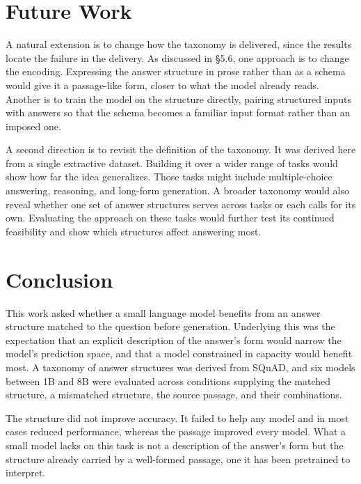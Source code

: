 \documentclass{article}
\begin{document}
\section{Future Work}

A natural extension is to change how the taxonomy is delivered, since the results locate the failure in the delivery. As discussed in \S5.6, one approach is to change the encoding. Expressing the answer structure in prose rather than as a schema would give it a passage-like form, closer to what the model already reads. Another is to train the model on the structure directly, pairing structured inputs with answers so that the schema becomes a familiar input format rather than an imposed one.

A second direction is to revisit the definition of the taxonomy. It was derived here from a single extractive dataset. Building it over a wider range of tasks would show how far the idea generalizes. Those tasks might include multiple-choice answering, reasoning, and long-form generation. A broader taxonomy would also reveal whether one set of answer structures serves across tasks or each calls for its own. Evaluating the approach on these tasks would further test its continued feasibility and show which structures affect answering most.

\section{Conclusion}

This work asked whether a small language model benefits from an answer structure matched to the question before generation. Underlying this was the expectation that an explicit description of the answer's form would narrow the model's prediction space, and that a model constrained in capacity would benefit most. A taxonomy of answer structures was derived from SQuAD, and six models between 1B and 8B were evaluated across conditions supplying the matched structure, a mismatched structure, the source passage, and their combinations.

The structure did not improve accuracy. It failed to help any model and in most cases reduced performance, whereas the passage improved every model. What a small model lacks on this task is not a description of the answer's form but the structure already carried by a well-formed passage, one it has been pretrained to interpret.
\end{document}
